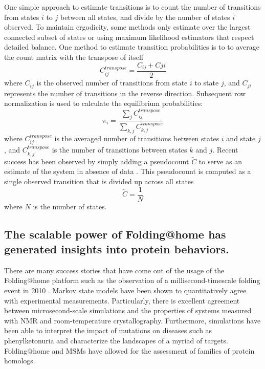 \documentclass[../main.tex]{subfiles}
\begin{document}
        One simple approach to estimate transitions is to count the number of transitions from states $i$ to $j$ between all states, and divide by the number of states $i$ observed. To maintain ergodicity, some methods only estimate over the largest connected subset of states\cite{prinz_optimal_2011} or using maximum likelihood estimators that respect detailed balance\cite{prinz_markov_2011}. One method to estimate transition probabilities is to to average the count matrix with the transpose of itself  
        \begin{equation}\label{transpose-count-eq}
        	C^{transpose}_{ij}=\frac{C_{ij}+C{ji}}{2}
        \end{equation}
        where $C_{ij}$ is the observed number of transitions from state $i$ to state $j$, and $C_{ji}$ represents the number of transitions in the reverse direction. Subsequent row normalization is used to calculate the equilibrium probabilities: 
        \begin{equation}\label{row-normalize-eq}
        	\pi_i = \frac{\sum_j{C_{ij}^{transpose}}}{\sum_{k,j}{C_{k,j}^{transpose}}}
        \end{equation}
        where $C_{ij}^{transpose}$ is the averaged number of transitions between states $i$ and state $j$, and $C_{k,j}^{transpose}$ is the number of transitions between states $k$ and $j$. Recent success has been observed by simply adding a pseudocount $\tilde C$ to serve as an estimate of the system in absence of data \cite{Zimmerman:2018jn,Cruz2020vp35}. This pseudocount is computed as a single observed transition that is divided up across all states
        \begin{equation}\label{implied-timescales-eq}
        	\tilde C = \frac{1}{N}
        \end{equation}
        where $N$ is the number of states. 

	\subsection{The scalable power of Folding@home has generated insights into protein behaviors.}
		There are many success stories that have come out of the usage of the Folding@home platform such as the observation of a millisecond-timescale folding event in 2010 \cite{Voelz:2010hs}. Markov state models have been shown to quantitatively agree with experimental measurements\cite{Bowman:2011bc,Chodera:2014gk}. Particularly, there is excellent agreement between microsecond-scale simulations and the properties of systems measured with NMR and room-temperature crystallography\cite{Bowman:2015da,bowman2014extensive}. Furthermore, simulations have been able to interpret the impact of mutations on diseases such as phenylketonuria\cite{ge_simulations_2018} and characterize the landscapes of a myriad of targets\cite{chen_dynamic_2019}. Folding@home and MSMs have allowed for the assessment of families of protein homologs\cite{porter_conformational_2020}.
\end{document}
